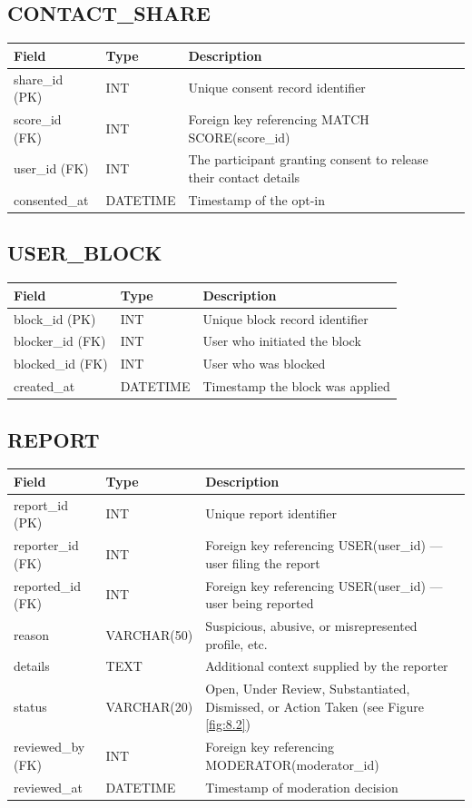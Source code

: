 \documentclass[12pt,a4paper]{report}
\begin{document}
\subsection*{CONTACT\_SHARE}
\begin{longtable}{L{3.2cm}L{2.5cm}L{8.5cm}}
\toprule
\textbf{Field} & \textbf{Type} & \textbf{Description} \\
\midrule
\endhead
share\_id (PK) & INT & Unique consent record identifier \\
score\_id (FK) & INT & Foreign key referencing MATCH SCORE(score\_id) \\
user\_id (FK) & INT & The participant granting consent to release their contact details \\
consented\_at & DATETIME & Timestamp of the opt-in \\
\bottomrule
\end{longtable}

\subsection*{USER\_BLOCK}
\begin{longtable}{L{3.2cm}L{2.5cm}L{8.5cm}}
\toprule
\textbf{Field} & \textbf{Type} & \textbf{Description} \\
\midrule
\endhead
block\_id (PK) & INT & Unique block record identifier \\
blocker\_id (FK) & INT & User who initiated the block \\
blocked\_id (FK) & INT & User who was blocked \\
created\_at & DATETIME & Timestamp the block was applied \\
\bottomrule
\end{longtable}

\subsection*{REPORT}
\begin{longtable}{L{3.2cm}L{2.5cm}L{8.5cm}}
\toprule
\textbf{Field} & \textbf{Type} & \textbf{Description} \\
\midrule
\endhead
report\_id (PK) & INT & Unique report identifier \\
reporter\_id (FK) & INT & Foreign key referencing USER(user\_id) --- user filing the report \\
reported\_id (FK) & INT & Foreign key referencing USER(user\_id) --- user being reported \\
reason & VARCHAR(50) & Suspicious, abusive, or misrepresented profile, etc. \\
details & TEXT & Additional context supplied by the reporter \\
status & VARCHAR(20) & Open, Under Review, Substantiated, Dismissed, or Action Taken (see Figure \ref{fig:8.2}) \\
reviewed\_by (FK) & INT & Foreign key referencing MODERATOR(moderator\_id) \\
reviewed\_at & DATETIME & Timestamp of moderation decision \\
\bottomrule
\end{longtable}
\end{document}
